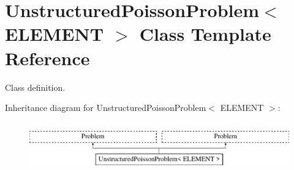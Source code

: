 \hypertarget{classUnstructuredPoissonProblem}{}\section{Unstructured\+Poisson\+Problem$<$ E\+L\+E\+M\+E\+NT $>$ Class Template Reference}
\label{classUnstructuredPoissonProblem}


Class definition.  


Inheritance diagram for Unstructured\+Poisson\+Problem$<$ E\+L\+E\+M\+E\+NT $>$\+:\begin{figure}[H]
\begin{center}
\leavevmode
\includegraphics[height=2.000000cm]{classUnstructuredPoissonProblem}
\end{center}
\end{figure}
